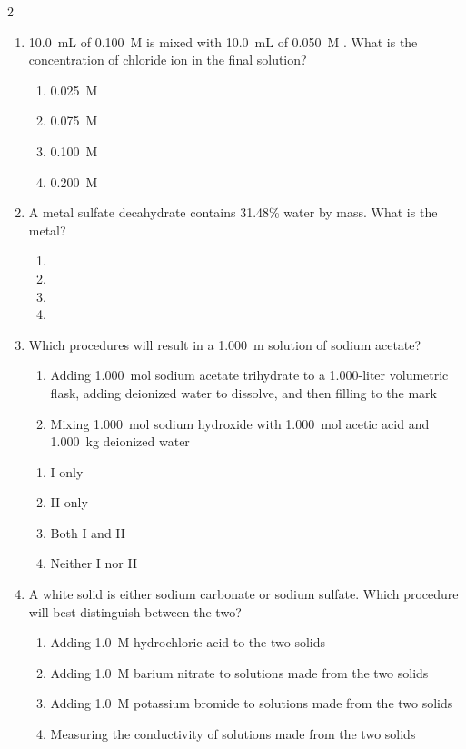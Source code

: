 \documentclass[titlepage,10pt,letterpaper]{article}
\begin{document}
\begin{multicols}{2}
\begin{enumerate}[leftmargin=*]
\item 10.0~mL of 0.100~M  is mixed with 10.0~mL of 0.050~M . What is the concentration of chloride ion in the final solution?
\begin{enumerate}[label=(\alph*)]
    \item 0.025~M
    \item 0.075~M
    \item 0.100~M
    \item 0.200~M
\end{enumerate}

\item A metal sulfate decahydrate contains 31.48\% water by mass. What is the metal?
\begin{enumerate}[label=(\alph*)]
    \item {}
    \item {}
    \item {}
    \item {}
\end{enumerate}

\item Which procedures will result in a 1.000~m solution of sodium acetate?
\begin{enumerate}[label=\Roman*.]
    \item Adding 1.000~mol sodium acetate trihydrate to a 1.000-liter volumetric flask, adding deionized water to dissolve, and then filling to the mark
    \item Mixing 1.000~mol sodium hydroxide with 1.000~mol acetic acid and 1.000~kg deionized water
\end{enumerate}
\begin{enumerate}[label=(\alph*)]
    \item I only
    \item II only
    \item Both I and II
    \item Neither I nor II
\end{enumerate}

\item A white solid is either sodium carbonate or sodium sulfate. Which procedure will best distinguish between the two?
\begin{enumerate}[label=(\alph*)]
    \item Adding 1.0~M hydrochloric acid to the two solids
    \item Adding 1.0~M barium nitrate to solutions made from the two solids
    \item Adding 1.0~M potassium bromide to solutions made from the two solids
    \item Measuring the conductivity of solutions made from the two solids
\end{enumerate}


\end{enumerate}
\end{multicols}
\end{document}
